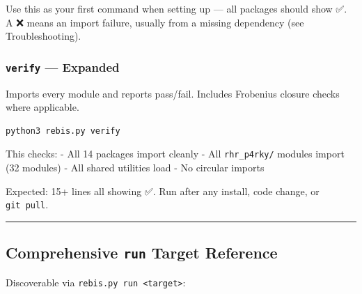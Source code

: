 Use this as your first command when setting up --- all packages should
show ✅. A ❌ means an import failure, usually from a missing dependency
(see Troubleshooting).

\hypertarget{verify-expanded}{%
\subsubsection{\texorpdfstring{\texttt{verify} ---
Expanded}{verify --- Expanded}}\label{verify-expanded}}

Imports every module and reports pass/fail. Includes Frobenius closure
checks where applicable.

\begin{verbatim}
python3 rebis.py verify
\end{verbatim}

This checks: - All 14 packages import cleanly - All \texttt{rhr\_p4rky/}
modules import (32 modules) - All shared utilities load - No circular
imports

Expected: 15+ lines all showing ✅. Run after any install, code change,
or \texttt{git\ pull}.

\begin{center}\rule{0.5\linewidth}{0.5pt}\end{center}

\hypertarget{comprehensive-run-target-reference}{%
\subsection{\texorpdfstring{Comprehensive \texttt{run} Target
Reference}{Comprehensive run Target Reference}}\label{comprehensive-run-target-reference}}

Discoverable via
\texttt{rebis.py\ run\ \textless{}target\textgreater{}}:

